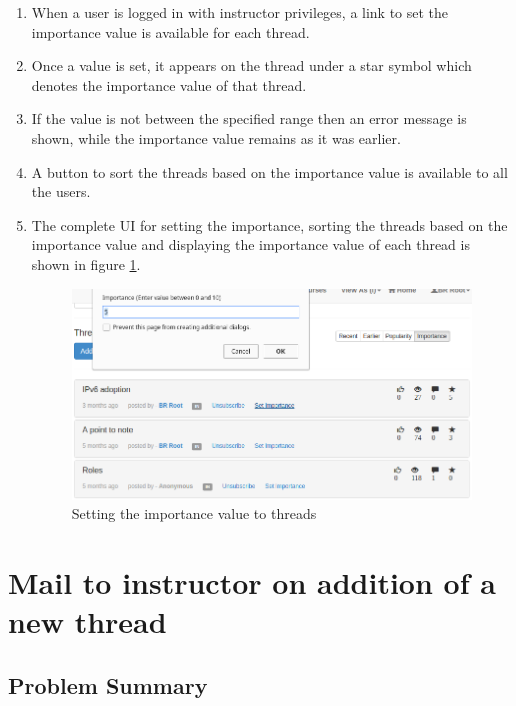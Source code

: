 \begin{enumerate}
	\item When a user is logged in with instructor privileges, a link to set the importance value is available for each thread.
	\item Once a value is set, it appears on the thread under a star symbol which denotes the importance value of that thread.
	\item If the value is not between the specified range then an error message is shown, while the importance value remains as it was earlier.
	\item A button to sort the threads based on the importance value is available to all the users.
	\item The complete UI for setting the importance, sorting the threads based on the importance value and displaying the importance value of each thread is shown in figure \ref{fig:set-importance}.
	
	\newpage
	
	\begin{figure}[h]
		\centering
		\includegraphics[width=0.95\linewidth]{./media/set_importance}
		\caption{Setting the importance value to threads}
		\label{fig:set-importance}
	\end{figure}
		
\end{enumerate}

\newpage

\section{Mail to instructor on addition of a new thread}

\subsection{Problem Summary}

